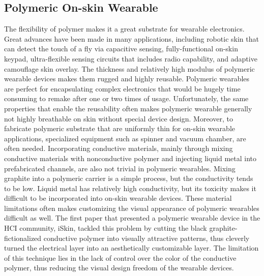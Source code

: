 \documentclass{sigchi}
\begin{document}
\subsection{Polymeric On-skin Wearable}
The flexibility of polymer makes it a great substrate for wearable electronics. Great advances have been made in many applications, including robotic skin that can detect the touch of a fly via capacitive sensing, fully-functional on-skin keypad, ultra-flexible sensing circuits that includes radio capability, and adaptive camouflage skin overlay. The thickness and relatively high modulus %
of polymeric wearable devices makes them rugged and highly reusable. Polymeric wearables are perfect for encapsulating complex electronics that would be hugely time consuming to remake after one or two times of usage. Unfortunately, the same properties that enable the reusability often makes polymeric wearable generally not highly breathable on skin without special device design. Moreover, to fabricate polymeric substrate that are uniformly thin for on-skin wearable applications, specialized equipment such as spinner and vacuum chamber, are often needed. Incorporating conductive materials, mainly through mixing conductive materials with nonconductive polymer and injecting liquid metal into prefabricated channels, are also not trivial in polymeric wearables. Mixing graphite into a polymeric carrier is a simple process, but the conductivity tends to be low. Liquid metal has relatively high conductivity, but its toxicity makes it difficult to be incorporated into %
on-skin wearable devices. These material limitations often makes customizing the visual appearance of polymeric wearables difficult as well. The first paper that presented a polymeric wearable device in the HCI community, iSkin, tackled this problem by cutting the black graphite-fictionalized conductive polymer into visually attractive patterns, thus cleverly turned %
 the electrical layer into an aesthetically customizable layer. The limitation of this technique lies in the lack of control over the color of the conductive polymer, thus reducing the visual design freedom of the wearable devices. 
\end{document}

